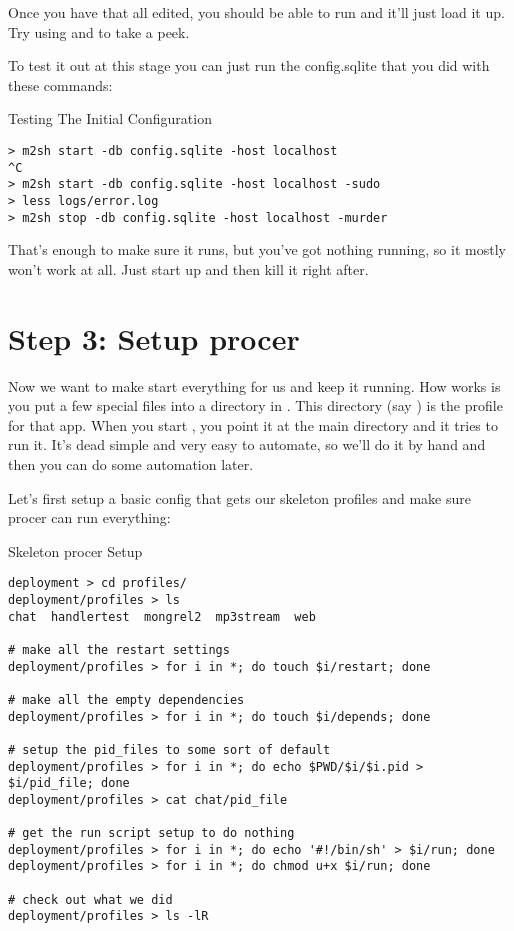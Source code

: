 Once you have that all edited, you should be able to run  and it'll just load it up.  Try using
 and  to take a peek.


To test it out at this stage you can just run the config.sqlite that you
did with these commands:

\begin{code}{Testing The Initial Configuration}
\begin{lstlisting}
> m2sh start -db config.sqlite -host localhost
^C
> m2sh start -db config.sqlite -host localhost -sudo
> less logs/error.log
> m2sh stop -db config.sqlite -host localhost -murder
\end{lstlisting}
\end{code}

That's enough to make sure it runs, but you've got nothing running,
so it mostly won't work at all.  Just start up and then kill it
right after.


\section{Step 3: Setup procer}

Now we want to make  start everything for us and keep
it running.  How  works is you put a few special
files into a directory in .  This directory (say )
is the profile for that app.  When you start , you
point it at the main  directory and it tries to run it.
It's dead simple and very easy to automate, so we'll do it by hand
and then you can do some automation later.

Let's first setup a basic config that gets our skeleton profiles
and make sure procer can run everything:

\begin{code}{Skeleton procer Setup}
\begin{lstlisting}
deployment > cd profiles/
deployment/profiles > ls
chat  handlertest  mongrel2  mp3stream  web

# make all the restart settings
deployment/profiles > for i in *; do touch $i/restart; done

# make all the empty dependencies
deployment/profiles > for i in *; do touch $i/depends; done

# setup the pid_files to some sort of default
deployment/profiles > for i in *; do echo $PWD/$i/$i.pid > $i/pid_file; done
deployment/profiles > cat chat/pid_file

# get the run script setup to do nothing
deployment/profiles > for i in *; do echo '#!/bin/sh' > $i/run; done
deployment/profiles > for i in *; do chmod u+x $i/run; done

# check out what we did
deployment/profiles > ls -lR
\end{lstlisting}
\end{code}

